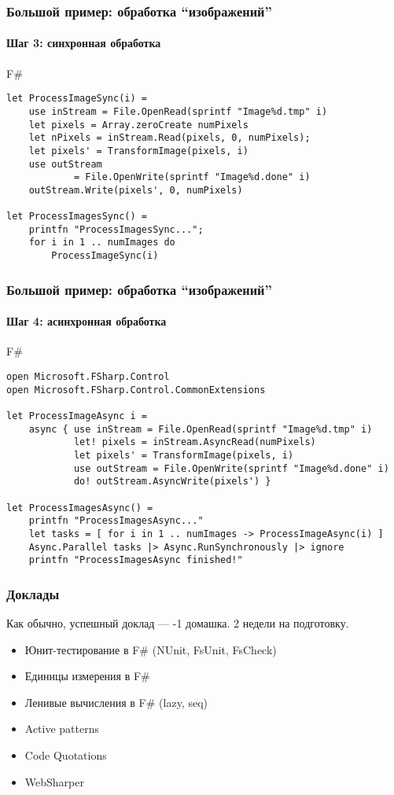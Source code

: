 \documentclass[xetex,mathserif,serif]{beamer}
\begin{document}
	\begin{frame}[fragile]
		\frametitle{Большой пример: обработка ``изображений''}
		\framesubtitle{Шаг 3: синхронная обработка}
   		\begin{exampleblock}{F\#}
   			\begin{lstlisting}
let ProcessImageSync(i) =
    use inStream = File.OpenRead(sprintf "Image%d.tmp" i)
    let pixels = Array.zeroCreate numPixels
    let nPixels = inStream.Read(pixels, 0, numPixels);
    let pixels' = TransformImage(pixels, i)
    use outStream 
            = File.OpenWrite(sprintf "Image%d.done" i)
    outStream.Write(pixels', 0, numPixels)

let ProcessImagesSync() =
    printfn "ProcessImagesSync...";
    for i in 1 .. numImages do
        ProcessImageSync(i)
\end{lstlisting}
\end{exampleblock}
\end{frame}

	\begin{frame}[fragile]
		\frametitle{Большой пример: обработка ``изображений''}
		\framesubtitle{Шаг 4: асинхронная обработка}
   		\begin{exampleblock}{F\#}
   			\begin{lstlisting}[basicstyle=\scriptsize]
open Microsoft.FSharp.Control
open Microsoft.FSharp.Control.CommonExtensions

let ProcessImageAsync i =
    async { use inStream = File.OpenRead(sprintf "Image%d.tmp" i)
            let! pixels = inStream.AsyncRead(numPixels)
            let pixels' = TransformImage(pixels, i)
            use outStream = File.OpenWrite(sprintf "Image%d.done" i)
            do! outStream.AsyncWrite(pixels') }

let ProcessImagesAsync() =
    printfn "ProcessImagesAsync..."
    let tasks = [ for i in 1 .. numImages -> ProcessImageAsync(i) ]
    Async.Parallel tasks |> Async.RunSynchronously |> ignore
    printfn "ProcessImagesAsync finished!"
\end{lstlisting}
\end{exampleblock}
\end{frame}

	\begin{frame}
		\frametitle{Доклады}
		Как обычно, успешный доклад --- -1 домашка. 2 недели на подготовку.
		\begin{itemize}
    		\item Юнит-тестирование в F\# (NUnit, FsUnit, FsCheck)
    		\item Единицы измерения в F\# 
    		\item Ленивые вычисления в F\# (lazy, seq)
    		\item Active patterns
    		\item Code Quotations
    		\item WebSharper    		
		\end{itemize}
    \end{frame}
\end{document}
